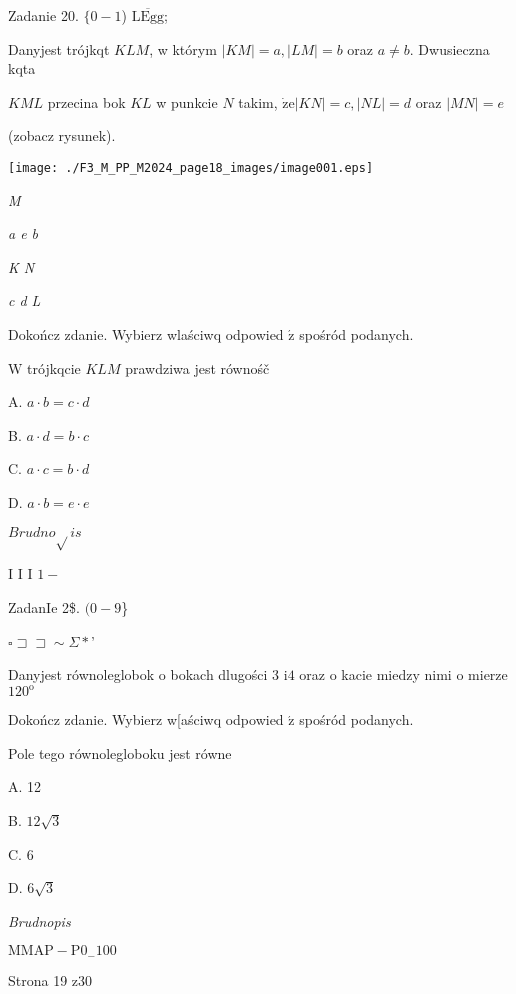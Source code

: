 \documentclass[a4paper,12pt]{article}
\begin{document}
Zadanie 20. $\{0-1$) $\overline{\mathrm{L}\mathrm{E}\mathrm{g}\mathrm{g}}$;

Danyjest trójkqt $KLM$, w którym $|KM|=a, |LM|=b$ oraz $a\neq b$. Dwusieczna kqta

$KML$ przecina bok $KL$ w punkcie $N$ takim, $\dot{\mathrm{z}}\mathrm{e} |KN|=c, |NL|=d$ oraz $|MN|=e$

(zobacz rysunek).
\begin{center}
\texttt{[image: ./F3\_M\_PP\_M2024\_page18\_images/image001.eps]}
\end{center}
{\it M}

{\it a e  b}

{\it K N}

{\it c  d L}

Dokończ zdanie. Wybierz wlaściwq odpowied $\acute{\mathrm{z}}$ spośród podanych.

$\mathrm{W}$ trójkqcie $KLM$ prawdziwa jest równośč

A. $a\cdot b=c\cdot d$

B. $a\cdot d=b\cdot c$

C. $a\cdot c=b\cdot d$

D. $a\cdot b=e\cdot e$

$Brudno\sqrt{}is$

I I I $1 -$

ZadanIe 2{\$}. $(0-9$\}

$\square \sqsupset\sqsupset\sim\Sigma*$'

Danyjest równoleglobok o bokach dlugości 3 $\mathrm{i} 4$ oraz o kacie miedzy nimi o mierze $120^{\mathrm{o}}$

Dokończ zdanie. Wybierz w[aściwq odpowied $\acute{\mathrm{z}}$ spośród podanych.

Pole tego równolegloboku jest równe

A. 12

B. $12\sqrt{3}$

C. 6

D. $6\sqrt{3}$

{\it Brudnopis}

$\mathrm{M}\mathrm{M}\mathrm{A}\mathrm{P}-\mathrm{P}0_{-}100$

Strona 19 z30
\end{document}

